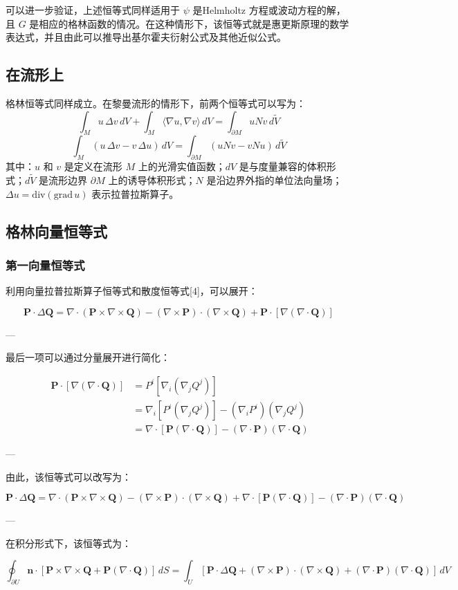 可以进一步验证，上述恒等式同样适用于 $\psi$ 是Helmholtz 方程或波动方程的解，且 $G$ 是相应的格林函数的情况。在这种情形下，该恒等式就是惠更斯原理的数学表达式，并且由此可以推导出基尔霍夫衍射公式及其他近似公式。
\subsection{在流形上}
格林恒等式同样成立。在黎曼流形的情形下，前两个恒等式可以写为：
$$
\int_{M} u\,\Delta v\, dV + \int_{M} \langle \nabla u, \nabla v \rangle\, dV
= \int_{\partial M} u N v\, d\widetilde{V}~
$$
$$
\int_{M} \left(u\,\Delta v - v\,\Delta u\right)\, dV
= \int_{\partial M} \left(u N v - v N u\right)\, d\widetilde{V}~
$$
其中：$u$ 和 $v$ 是定义在流形 $M$ 上的光滑实值函数；$dV$ 是与度量兼容的体积形式；$d\widetilde{V}$ 是流形边界 $\partial M$ 上的诱导体积形式；$N$ 是沿边界外指的单位法向量场；$\Delta u = \mathrm{div}(\mathrm{grad}\,u)$ 表示拉普拉斯算子。
\subsection{格林向量恒等式}
\subsubsection{第一向量恒等式}
利用向量拉普拉斯算子恒等式和散度恒等式[4]，可以展开：

$$
\mathbf{P} \cdot \Delta \mathbf{Q}
= \nabla \cdot (\mathbf{P} \times \nabla \times \mathbf{Q})
- (\nabla \times \mathbf{P}) \cdot (\nabla \times \mathbf{Q})
+ \mathbf{P} \cdot [\nabla (\nabla \cdot \mathbf{Q})]~
$$

---

最后一项可以通过分量展开进行简化：

$$
\begin{aligned}
\mathbf{P} \cdot [\nabla (\nabla \cdot \mathbf{Q})]
&= P^i[\nabla_i(\nabla_j Q^j)] \\
&= \nabla_i[P^i(\nabla_j Q^j)] - (\nabla_i P^i)(\nabla_j Q^j) \\
&= \nabla \cdot [\mathbf{P}(\nabla \cdot \mathbf{Q})] - (\nabla \cdot \mathbf{P})(\nabla \cdot \mathbf{Q})
\end{aligned}
$$

---

由此，该恒等式可以改写为：

$$
\mathbf{P} \cdot \Delta \mathbf{Q}
= \nabla \cdot (\mathbf{P} \times \nabla \times \mathbf{Q})
- (\nabla \times \mathbf{P}) \cdot (\nabla \times \mathbf{Q})
+ \nabla \cdot [\mathbf{P}(\nabla \cdot \mathbf{Q})]
- (\nabla \cdot \mathbf{P})(\nabla \cdot \mathbf{Q})
$$

---

在积分形式下，该恒等式为：

$$
\oint_{\partial U} 
\mathbf{n} \cdot 
[\mathbf{P} \times \nabla \times \mathbf{Q} 
+ \mathbf{P} (\nabla \cdot \mathbf{Q})]\, dS
= 
\int_{U} 
[
\mathbf{P} \cdot \Delta \mathbf{Q} 
+ (\nabla \times \mathbf{P}) \cdot (\nabla \times \mathbf{Q})
+ (\nabla \cdot \mathbf{P})(\nabla \cdot \mathbf{Q})
]\, dV
$$
